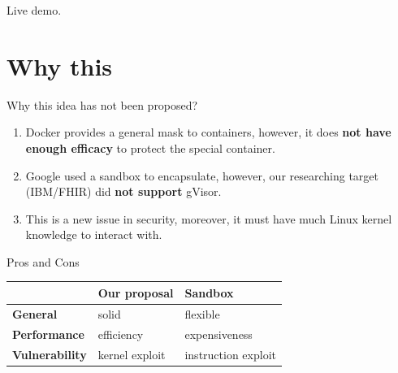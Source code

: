 \documentclass{beamer}
\begin{document}
\begin{CJK*}{UTF8}{bsmi}
    \begin{frame}
        \centering
        \Huge Live demo.
    \end{frame}

    \section{Why this}
    \begin{frame}{Why this idea has not been proposed?}
        \begin{enumerate}
            \item Docker provides a general mask to containers, however, it does {\color{blue} \textbf{not have enough efficacy}} to protect the special container.
            \item Google used a sandbox to encapsulate, however, our researching target (IBM/FHIR) did {\color{red} \textbf{not support}} gVisor.
            \item This is a new issue in security, moreover, it must have much Linux kernel knowledge to interact with.
        \end{enumerate}
    \end{frame}

    \begin{frame}{Pros and Cons}
        \begin{table}[]
            \begin{tabular}{|l|l|l|}
                \hline
                                       & \textbf{Our proposal}          & \textbf{Sandbox}                      \\ \hline
                \textbf{General}       & {\color{red} {solid}}          & flexible                              \\ \hline
                \textbf{Performance}   & {\color{mygreen} {efficiency}} & expensiveness                         \\ \hline
                \textbf{Vulnerability} & kernel exploit                 & {\color{mygreen} instruction} exploit \\ \hline
            \end{tabular}
        \end{table}
    \end{frame}


\end{CJK*}
\end{document}
